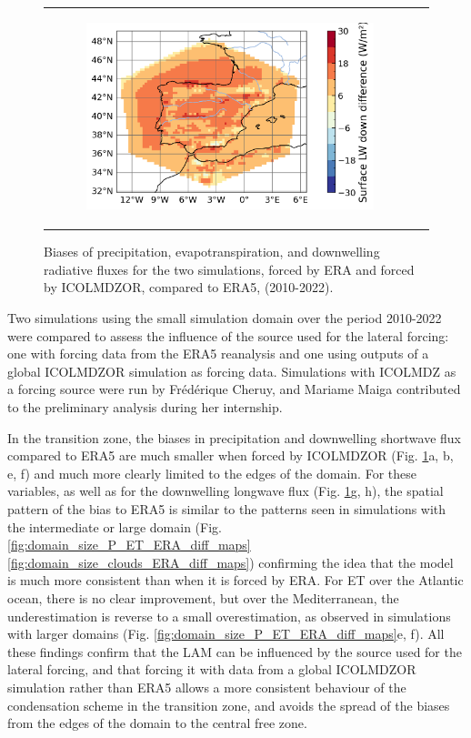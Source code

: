 \begin{figure}[!h]
\begin{tabular}{cc}
\begin{subfigure}[b]{0.33\textwidth}
            \includegraphics[width=\textwidth]{images/chap4/forcing_source/diff_map_LWdnSFC_ico_era.png}
        \end{subfigure}
    \end{tabular}
    \caption{Biases of precipitation, evapotranspiration, and downwelling radiative fluxes for the two simulations, forced by ERA and forced by ICOLMDZOR, compared to ERA5, (2010-2022).}
    \label{fig:forcing_source_ERA_diff_maps_endvars}
\end{figure}

Two simulations using the small simulation domain over the period 2010-2022 were compared to assess the influence of the source used for the lateral forcing: one with forcing data from the ERA5 reanalysis and one using outputs of a global ICOLMDZOR simulation as forcing data. 
Simulations with ICOLMDZ as a forcing source were run by Frédérique Cheruy, and Mariame Maiga contributed to the preliminary analysis during her internship.

\hfill

In the transition zone, the biases in precipitation and downwelling shortwave flux compared to ERA5 are much smaller when forced by ICOLMDZOR (Fig. \ref{fig:forcing_source_ERA_diff_maps_endvars}a, b, e, f) and much more clearly limited to the edges of the domain. For these variables, as well as for the downwelling longwave flux (Fig. \ref{fig:forcing_source_ERA_diff_maps_endvars}g, h), the spatial pattern of the bias to ERA5 is similar to the patterns seen in simulations with the intermediate or large domain (Fig. \ref{fig:domain_size_P_ET_ERA_diff_maps} \ref{fig:domain_size_clouds_ERA_diff_maps}) confirming the idea that the model is much more consistent than when it is forced by ERA. 
For ET over the Atlantic ocean, there is no clear improvement, but over the Mediterranean, the underestimation is reverse to a small overestimation, as observed in simulations with larger domains (Fig. \ref{fig:domain_size_P_ET_ERA_diff_maps}e, f).
All these findings confirm that the LAM can be influenced by the source used for the lateral forcing, and that forcing it with data from a global ICOLMDZOR simulation rather than ERA5 allows a more consistent behaviour of the condensation scheme in the transition zone, and avoids the spread of the biases from the edges of the domain to the central free zone.

